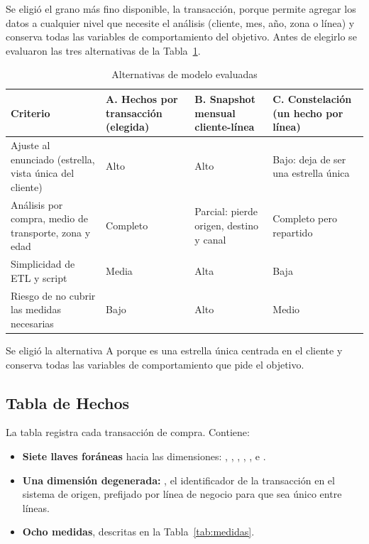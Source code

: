 Se eligió el grano más fino disponible, la transacción, porque permite
agregar los datos a cualquier nivel que necesite el análisis (cliente, mes,
año, zona o línea) y conserva todas las variables de comportamiento del
objetivo. Antes de elegirlo se evaluaron las tres alternativas de la
Tabla~\ref{tab:alternativas}.

\begin{table}[!htbp]
  \centering
  \caption{Alternativas de modelo evaluadas}
  \label{tab:alternativas}
  \small
  \begin{tabularx}{\linewidth}{@{}>{\raggedright\arraybackslash}X
                                  >{\raggedright\arraybackslash}X
                                  >{\raggedright\arraybackslash}X
                                  >{\raggedright\arraybackslash}X@{}}
    \toprule
    \textbf{Criterio} & \textbf{A. Hechos por transacción (elegida)}
      & \textbf{B. Snapshot mensual cliente-línea}
      & \textbf{C. Constelación (un hecho por línea)} \\
    \midrule
    Ajuste al enunciado (estrella, vista única del cliente)
      & Alto & Alto & Bajo: deja de ser una estrella única \\
    Análisis por compra, medio de transporte, zona y edad
      & Completo & Parcial: pierde origen, destino y canal
      & Completo pero repartido \\
    Simplicidad de ETL y script & Media & Alta & Baja \\
    Riesgo de no cubrir las medidas necesarias & Bajo & Alto & Medio \\
    \bottomrule
  \end{tabularx}
\end{table}

Se eligió la alternativa A porque es una estrella única centrada en el
cliente y conserva todas las variables de comportamiento que pide el objetivo.

\subsection{Tabla de Hechos}

La tabla  registra cada transacción de compra. Contiene:

\begin{itemize}[leftmargin=*]
  \item \textbf{Siete llaves foráneas} hacia las dimensiones: ,
        , , ,
        ,  e .
  \item \textbf{Una dimensión degenerada:} , el
        identificador de la transacción en el sistema de origen, prefijado por
        línea de negocio para que sea único entre líneas.
  \item \textbf{Ocho medidas}, descritas en la Tabla~\ref{tab:medidas}.
\end{itemize}

